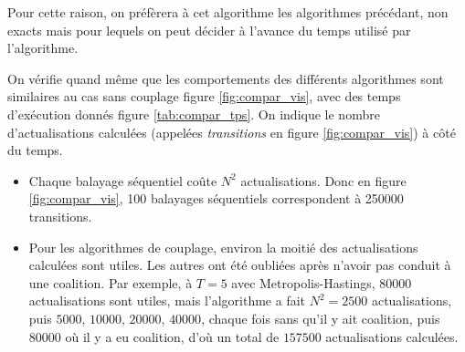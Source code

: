 \documentclass[a4paper,11pt]{article}
\begin{document}
Pour cette raison, on préfèrera à cet algorithme les algorithmes précédant, non exacts mais pour lequels on peut décider à l'avance du temps utilisé par l'algorithme.

On vérifie quand même que les comportements des différents algorithmes sont similaires au cas sans couplage figure \ref{fig:compar_vis}, avec des temps d'exécution donnés figure \ref{tab:compar_tps}. On indique le nombre d'actualisations calculées (appelées \emph{transitions} en figure \ref{fig:compar_vis}) à côté du temps.
\begin{rk}

\begin{itemize}
	\item Chaque balayage séquentiel coûte $N^2$ actualisations. Donc en figure \ref{fig:compar_vis}, 100 balayages séquentiels correspondent à 250000 transitions.
	\item Pour les algorithmes de couplage, environ la moitié des actualisations calculées sont utiles. Les autres ont été oubliées après n'avoir pas conduit à une coalition. Par exemple, à $T = 5$ avec Metropolis-Hastings, $80000$ actualisations sont utiles, mais l'algorithme a fait $N^2 = 2500$ actualisations, puis $5000$, $10000$, $20000$, $40000$, chaque fois sans qu'il y ait coalition, puis $80000$ où il y a eu coalition, d'où un total de $157500$ actualisations calculées.
\end{itemize}
\end{rk}
\end{document}
